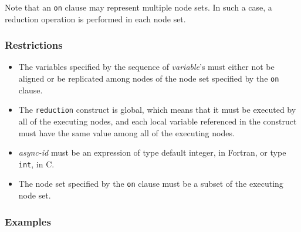 Note that an {\tt on} clause may represent multiple node sets. In such a
case, a reduction operation is performed in each node set.

\subsubsection*{Restrictions}

\begin{itemize}
 \item The variables specified by the sequence of {\it variable}'s must
       either not be aligned or be replicated among nodes of the node
       set specified by the {\tt on} clause.
 \item The {\tt reduction} construct is global, which means that it must
       be executed by all of the executing nodes, and each local variable
       referenced in the construct must have the same value among all of
       the executing nodes.
 \item {\it async-id} must be an expression of type default integer, in
       Fortran, or type {\tt int}, in C.
 \item The node set specified by the {\tt on} clause must be a subset of the
       executing node set.
\end{itemize}

\subsubsection*{Examples}

